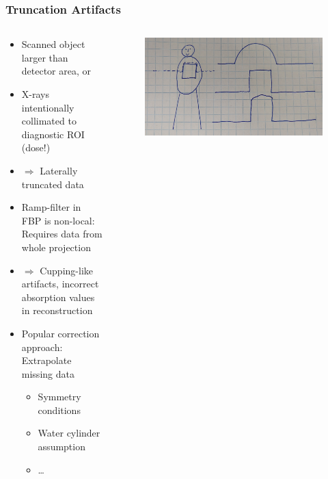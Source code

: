 \begin{frame}
	\frametitle{Truncation Artifacts}
	\begin{columns}[c, onlytextwidth]
		\begin{column}{0.65\textwidth}
		\begin{itemize}
		\setlength\itemsep{0.3cm}
		\item Scanned object larger than detector area, or
		\item X-rays intentionally collimated to diagnostic ROI (dose!)
		\item[ ] $\Rightarrow$ Laterally truncated data
		\item Ramp-filter in FBP is non-local: Requires data from whole projection
		\item[ ] $\Rightarrow$ Cupping-like artifacts, incorrect absorption values in reconstruction
		\item Popular correction approach: Extrapolate missing data
		      \begin{itemize}
			      \item Symmetry conditions
			      \item Water cylinder assumption
			      \item \ldots
		      \end{itemize}
		\end{itemize}
		\end{column}
		\begin{column}{0.35\textwidth}
		 \begin{figure}
			\centering
			\includegraphics[height=0.55\textwidth]{images/truncation_sketch}
		 \end{figure}
	\end{column}
	\end{columns}

\end{frame}

